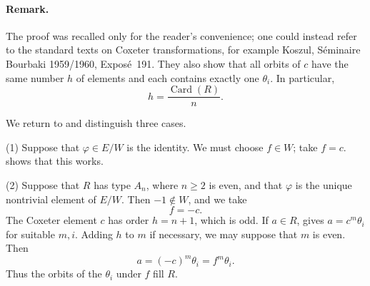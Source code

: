 \paragraph{\textbf{Remark.}}
The proof was recalled only for the reader's convenience; one
could instead refer to the standard texts on Coxeter
transformations, for example Koszul, Séminaire Bourbaki
1959/1960, Exposé~191. They also show that all orbits of \(c\)
have the same number \(h\) of elements and each contains exactly
one \(\theta_i\). In particular,
\[
  h=\frac{\operatorname{Card}(R)}{n}.
\]

We return to  and distinguish three cases.

\medskip
\noindent\textup{(1)}
Suppose that \(\varphi\in E/W\) is the identity. We must choose
\(f\in W\); take \(f=c\).  shows that this works.

\medskip
\noindent\textup{(2)}
Suppose that \(R\) has type \(A_n\), where \(n\ge2\) is even, and
that \(\varphi\) is the unique nontrivial element of \(E/W\).
Then \(-1\notin W\), and we take
\[
  f=-c.
\]
The Coxeter element \(c\) has order \(h=n+1\), which is odd. If
\(a\in R\),  gives \(a=c^m\theta_i\) for suitable \(m,i\).
Adding \(h\) to \(m\) if necessary, we may suppose that \(m\) is
even. Then
\[
  a=(-c)^m\theta_i=f^m\theta_i.
\]
Thus the orbits of the \(\theta_i\) under \(f\) fill \(R\).
